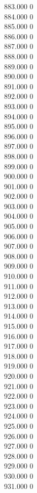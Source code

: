 { 883.000	0 \\
 884.000	0 \\
 885.000	0 \\
 886.000	0 \\
 887.000	0 \\
 888.000	0 \\
 889.000	0 \\
 890.000	0 \\
 891.000	0 \\
 892.000	0 \\
 893.000	0 \\
 894.000	0 \\
 895.000	0 \\
 896.000	0 \\
 897.000	0 \\
 898.000	0 \\
 899.000	0 \\
 900.000	0 \\
 901.000	0 \\
 902.000	0 \\
 903.000	0 \\
 904.000	0 \\
 905.000	0 \\
 906.000	0 \\
 907.000	0 \\
 908.000	0 \\
 909.000	0 \\
 910.000	0 \\
 911.000	0 \\
 912.000	0 \\
 913.000	0 \\
 914.000	0 \\
 915.000	0 \\
 916.000	0 \\
 917.000	0 \\
 918.000	0 \\
 919.000	0 \\
 920.000	0 \\
 921.000	0 \\
 922.000	0 \\
 923.000	0 \\
 924.000	0 \\
 925.000	0 \\
 926.000	0 \\
 927.000	0 \\
 928.000	0 \\
 929.000	0 \\
 930.000	0 \\
 931.000	0 \\
}
